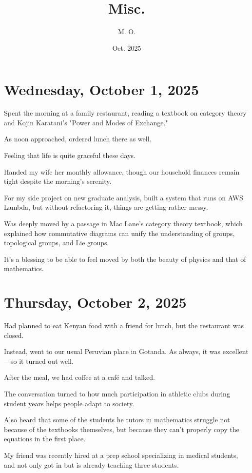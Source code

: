 \documentclass[uplatex]{jsarticle}
\title{
Misc.
}
\author{
M. O.
}
\date{Oct. 2025}
\begin{document}
\maketitle

\section{Wednesday, October 1, 2025}

Spent the morning at a family restaurant, reading a textbook on category theory and Kojin Karatani's "Power and Modes of Exchange."

As noon approached, ordered lunch there as well.

Feeling that life is quite graceful these days.

Handed my wife her monthly allowance, though our household finances remain tight despite the morning's serenity.

For my side project on new graduate analysis, built a system that runs on AWS Lambda, but without refactoring it, things are getting rather messy.

Was deeply moved by a passage in Mac Lane's category theory textbook, which explained how commutative diagrams can unify the understanding of groups, topological groups, and Lie groups.

It's a blessing to be able to feel moved by both the beauty of physics and that of mathematics.



\section{Thursday, October 2, 2025}

Had planned to eat Kenyan food with a friend for lunch, but the restaurant was closed.

Instead, went to our usual Peruvian place in Gotanda. As always, it was excellent—so it turned out well.

After the meal, we had coffee at a café and talked.

The conversation turned to how much participation in athletic clubs during student years helps people adapt to society.

Also heard that some of the students he tutors in mathematics struggle not because of the textbooks themselves, but because they can't properly copy the equations in the first place.

My friend was recently hired at a prep school specializing in medical students, and not only got in but is already teaching three students.
\end{document}
